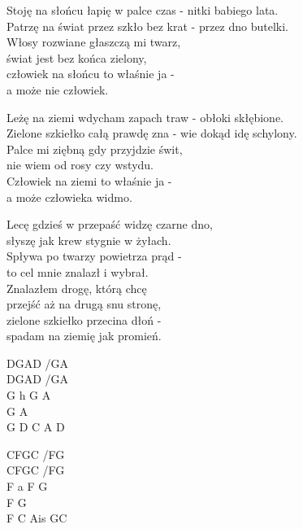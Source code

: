 \begin{text}
    Stoję na słońcu łapię w palce czas - nitki babiego lata.\\
    Patrzę na świat przez szkło bez krat - przez dno butelki.\\
    Włosy rozwiane głaszczą mi twarz,\\
    świat jest bez końca zielony,\\
    człowiek na słońcu to właśnie ja -\\
    a może nie człowiek.

    Leżę na ziemi wdycham zapach traw - obłoki skłębione.\\
    Zielone szkiełko całą prawdę zna - wie dokąd idę schylony.\\
    Palce mi ziębną gdy przyjdzie świt,\\
    nie wiem od rosy czy wstydu.\\
    Człowiek na ziemi to właśnie ja -\\
    a może człowieka widmo.

    Lecę gdzieś w przepaść widzę czarne dno,\\
    słyszę jak krew stygnie w żyłach.\\
    Spływa po twarzy powietrza prąd -\\
    to cel mnie znalazł i wybrał.\\
    Znalazłem drogę, którą chcę\\
    przejść aż na drugą snu stronę,\\
    zielone szkiełko przecina dłoń -\\
    spadam na ziemię jak promień.
\end{text}
\begin{chord}
    DGAD /GA\\
    DGAD /GA\\
    G h G A\\
    G A\\
    G D C A D

    CFGC /FG\\
    CFGC /FG\\
    F a F G\\
    F G\\
    F C Ais GC
\end{chord}